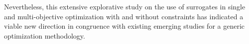 \documentclass[journal]{IEEEtran}
\begin{document}
Nevertheless, this extensive explorative study on the use of surrogates in single and multi-objective optimization with and without constraints has indicated a viable new direction in congruence with existing emerging studies for a generic optimization methodology. 









%


\end{document}
